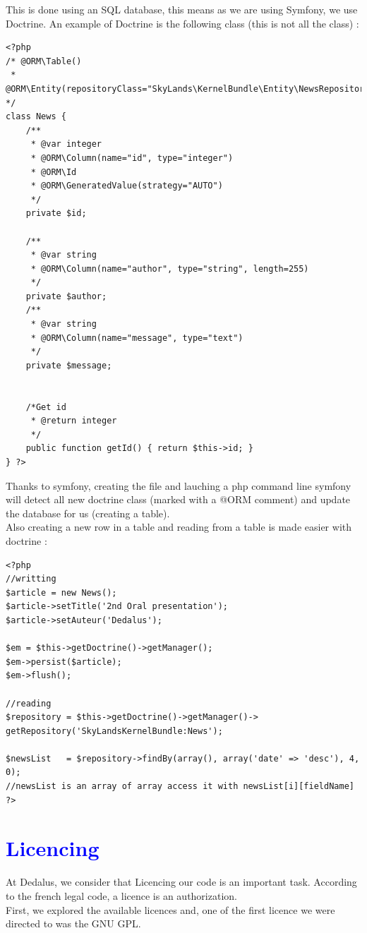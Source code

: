 \documentclass[article]{report}             %
\begin{document}
				This is done using an SQL database, this means as we are using Symfony, we use Doctrine. An example of Doctrine is the following class (this is not all the class) : 
\begin{lstlisting}
<?php
/* @ORM\Table()
 * @ORM\Entity(repositoryClass="SkyLands\KernelBundle\Entity\NewsRepository") */
class News {
    /**
     * @var integer
     * @ORM\Column(name="id", type="integer")
     * @ORM\Id
     * @ORM\GeneratedValue(strategy="AUTO")
     */
    private $id;

    /**
     * @var string
     * @ORM\Column(name="author", type="string", length=255)
     */
    private $author;
    /**
     * @var string
     * @ORM\Column(name="message", type="text")
     */
    private $message;


    /*Get id
     * @return integer 
     */
    public function getId() { return $this->id; }
} ?>
\end{lstlisting}
 		Thanks to symfony, creating the file and lauching a php command line symfony will detect all new doctrine class (marked with a @ORM comment) and update the database for us (creating a table).\\
 		Also creating a new row in a table and reading from a table is made easier with doctrine : 
\begin{lstlisting}
<?php
//writting
$article = new News();
$article->setTitle('2nd Oral presentation');
$article->setAuteur('Dedalus');

$em = $this->getDoctrine()->getManager();
$em->persist($article);
$em->flush();

//reading
$repository = $this->getDoctrine()->getManager()->
getRepository('SkyLandsKernelBundle:News');

$newsList   = $repository->findBy(array(), array('date' => 'desc'), 4, 0);
//newsList is an array of array access it with newsList[i][fieldName]
?>
\end{lstlisting}
		

		\chapter{\textcolor{blue}{Licencing}}
			At Dedalus, we consider that Licencing our code is an important task. According to the french legal code, a licence is an authorization.\\
			First, we explored the available licences and, one of the first licence we were directed to was the GNU GPL.
\end{document}
